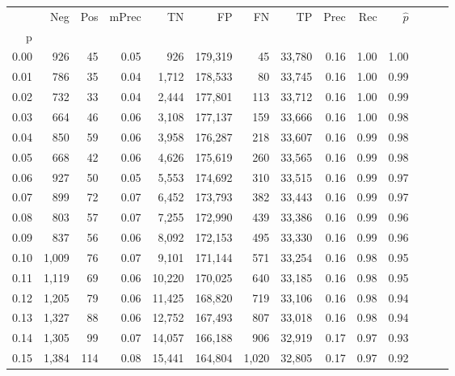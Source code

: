 \begin{tabular}{rrrrrrrrrrrrrr}
\toprule
{} &    Neg &  Pos & mPrec &       TN &       FP &      FN &      TP &  Prec &   Rec & $\hat{p}$ \\
p    &        &      &       &          &          &         &         &       &       &           \\
\midrule
0.00 &    926 &   45 &  0.05 &      926 &  179,319 &      45 &  33,780 &  0.16 &  1.00 &      1.00 \\
0.01 &    786 &   35 &  0.04 &    1,712 &  178,533 &      80 &  33,745 &  0.16 &  1.00 &      0.99 \\
0.02 &    732 &   33 &  0.04 &    2,444 &  177,801 &     113 &  33,712 &  0.16 &  1.00 &      0.99 \\
0.03 &    664 &   46 &  0.06 &    3,108 &  177,137 &     159 &  33,666 &  0.16 &  1.00 &      0.98 \\
0.04 &    850 &   59 &  0.06 &    3,958 &  176,287 &     218 &  33,607 &  0.16 &  0.99 &      0.98 \\
0.05 &    668 &   42 &  0.06 &    4,626 &  175,619 &     260 &  33,565 &  0.16 &  0.99 &      0.98 \\
0.06 &    927 &   50 &  0.05 &    5,553 &  174,692 &     310 &  33,515 &  0.16 &  0.99 &      0.97 \\
0.07 &    899 &   72 &  0.07 &    6,452 &  173,793 &     382 &  33,443 &  0.16 &  0.99 &      0.97 \\
0.08 &    803 &   57 &  0.07 &    7,255 &  172,990 &     439 &  33,386 &  0.16 &  0.99 &      0.96 \\
0.09 &    837 &   56 &  0.06 &    8,092 &  172,153 &     495 &  33,330 &  0.16 &  0.99 &      0.96 \\
0.10 &  1,009 &   76 &  0.07 &    9,101 &  171,144 &     571 &  33,254 &  0.16 &  0.98 &      0.95 \\
0.11 &  1,119 &   69 &  0.06 &   10,220 &  170,025 &     640 &  33,185 &  0.16 &  0.98 &      0.95 \\
0.12 &  1,205 &   79 &  0.06 &   11,425 &  168,820 &     719 &  33,106 &  0.16 &  0.98 &      0.94 \\
0.13 &  1,327 &   88 &  0.06 &   12,752 &  167,493 &     807 &  33,018 &  0.16 &  0.98 &      0.94 \\
0.14 &  1,305 &   99 &  0.07 &   14,057 &  166,188 &     906 &  32,919 &  0.17 &  0.97 &      0.93 \\
0.15 &  1,384 &  114 &  0.08 &   15,441 &  164,804 &   1,020 &  32,805 &  0.17 &  0.97 &      0.92 \\

\end{tabular}
